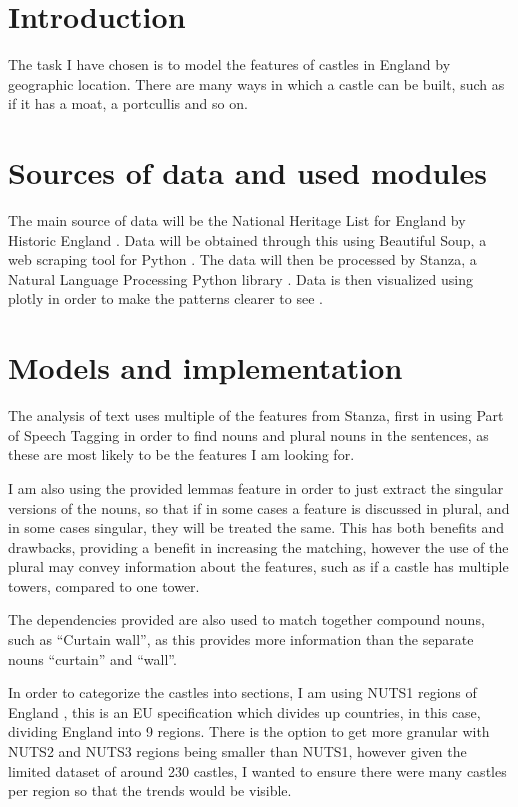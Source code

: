 \documentclass[11pt]{article}
\begin{document}
\maketitle

\section{Introduction}

The task I have chosen is to model the features of castles in England by geographic location. There are many ways in which a castle can be built, such as if it has a moat, a portcullis and so on.

\section{Sources of data and used modules}

The main source of data will be the National Heritage List for England by Historic England \cite{nhle}. Data will be obtained through this using Beautiful Soup, a web scraping tool for Python \cite{bs}. The data will then be processed by Stanza, a Natural Language Processing Python library \cite{qi2020stanza}. Data is then visualized using plotly in order to make the patterns clearer to see \cite{plotly}.

\section{Models and implementation}

The analysis of text uses multiple of the features from Stanza, first in using Part of Speech Tagging in order to find nouns and plural nouns in the sentences, as these are most likely to be the features I am looking for.

I am also using the provided lemmas feature in order to just extract the singular versions of the nouns, so that if in some cases a feature is discussed in plural, and in some cases singular, they will be treated the same. This has both benefits and drawbacks, providing a benefit in increasing the matching, however the use of the plural may convey information about the features, such as if a castle has multiple towers, compared to one tower.

The dependencies provided are also used to match together compound nouns, such as “Curtain wall”, as this provides more information than the separate nouns “curtain” and “wall”.

In order to categorize the castles into sections, I am using NUTS1 regions of England \cite{nuts}, this is an EU specification which divides up countries, in this case, dividing England into 9 regions. There is the option to get more granular with NUTS2 and NUTS3 regions being smaller than NUTS1, however given the limited dataset of around 230 castles, I wanted to ensure there were many castles per region so that the trends would be visible.
\end{document}
